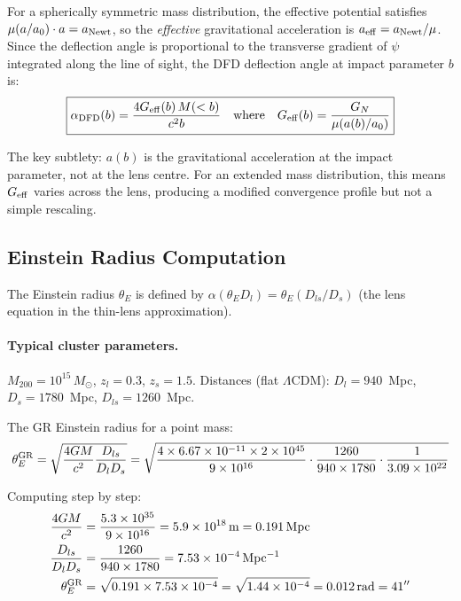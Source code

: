 \documentclass[11pt,a4paper]{article}
\newcommand{\LCDM}{$\Lambda$CDM}
\newcommand{\Geff}{G_{\rm eff}}
\newcommand{\ee}[1]{\times 10^{#1}}
\begin{document}
For a spherically symmetric mass distribution, the effective potential
satisfies $\mu(a/a_0) \cdot a = a_{\rm Newt}$, so the \emph{effective}
gravitational acceleration is $a_{\rm eff} = a_{\rm Newt}/\mu$.
Since the deflection angle is proportional to the transverse gradient
of $\psi$ integrated along the line of sight, the DFD deflection angle
at impact parameter $b$ is:
\begin{equation}
\boxed{
\alpha_{\rm DFD}(b) = \frac{4\Geff(b)\,M(<b)}{c^2 b}
\quad\text{where}\quad
\Geff(b) = \frac{G_N}{\mu(a(b)/a_0)}
}
\end{equation}

The key subtlety: $a(b)$ is the gravitational acceleration at the
impact parameter, not at the lens centre.  For an extended mass
distribution, this means $\Geff$ varies across the lens, producing a
modified convergence profile but not a simple rescaling.

\subsection{Einstein Radius Computation}

The Einstein radius $\theta_E$ is defined by $\alpha(\theta_E D_l) =
\theta_E (D_{ls}/D_s)$ (the lens equation in the thin-lens approximation).

\paragraph{Typical cluster parameters.}
$M_{200} = 10^{15}\,M_\odot$, $z_l = 0.3$, $z_s = 1.5$.
Distances (flat \LCDM): $D_l = 940$~Mpc, $D_s = 1780$~Mpc,
$D_{ls} = 1260$~Mpc.

The GR Einstein radius for a point mass:
\begin{equation}
\theta_E^{\rm GR} = \sqrt{\frac{4GM}{c^2}\frac{D_{ls}}{D_l D_s}}
= \sqrt{\frac{4 \times 6.67\ee{-11} \times 2\ee{45}}{9\ee{16}}
\cdot \frac{1260}{940 \times 1780} \cdot \frac{1}{3.09\ee{22}}}
\end{equation}

Computing step by step:
\begin{align}
\frac{4GM}{c^2} &= \frac{5.3\ee{35}}{9\ee{16}} = 5.9\ee{18}\,\text{m}
= 0.191\,\text{Mpc} \\
\frac{D_{ls}}{D_l D_s} &= \frac{1260}{940 \times 1780}
= 7.53\ee{-4}\,\text{Mpc}^{-1} \\
\theta_E^{\rm GR} &= \sqrt{0.191 \times 7.53\ee{-4}}
= \sqrt{1.44\ee{-4}} = 0.012\,\text{rad} = 41''
\end{align}
\end{document}
